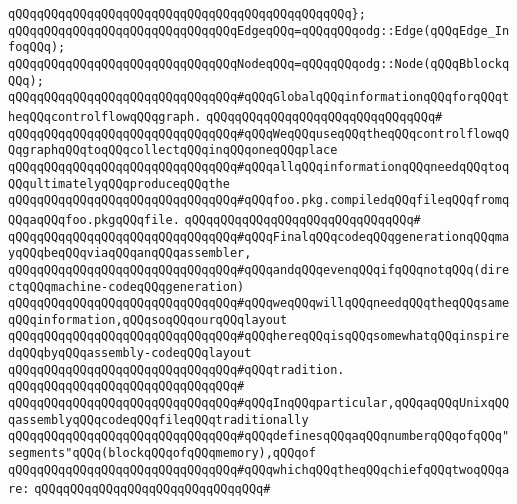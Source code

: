 \verb|qQQqqQQqqQQqqQQqqQQqqQQqqQQqqQQqqQQqqQQqqQQqqQQq};|\newline
\newline
\verb|qQQqqQQqqQQqqQQqqQQqqQQqqQQqqQQqEdgeqQQq=qQQqqQQqodg::Edge(qQQqEdge_InfoqQQq);|\newline
\verb|qQQqqQQqqQQqqQQqqQQqqQQqqQQqqQQqNodeqQQq=qQQqqQQqodg::Node(qQQqBblockqQQq);|\newline
\newline
\verb|qQQqqQQqqQQqqQQqqQQqqQQqqQQqqQQq#qQQqGlobalqQQqinformationqQQqforqQQqtheqQQqcontrolflowqQQqgraph.|\newline
\verb|qQQqqQQqqQQqqQQqqQQqqQQqqQQqqQQq#|\newline
\verb|qQQqqQQqqQQqqQQqqQQqqQQqqQQqqQQq#qQQqWeqQQquseqQQqtheqQQqcontrolflowqQQqgraphqQQqtoqQQqcollectqQQqinqQQqoneqQQqplace|\newline
\verb|qQQqqQQqqQQqqQQqqQQqqQQqqQQqqQQq#qQQqallqQQqinformationqQQqneedqQQqtoqQQqultimatelyqQQqproduceqQQqthe|\newline
\verb|qQQqqQQqqQQqqQQqqQQqqQQqqQQqqQQq#qQQqfoo.pkg.compiledqQQqfileqQQqfromqQQqaqQQqfoo.pkgqQQqfile.|\newline
\verb|qQQqqQQqqQQqqQQqqQQqqQQqqQQqqQQq#|\newline
\verb|qQQqqQQqqQQqqQQqqQQqqQQqqQQqqQQq#qQQqFinalqQQqcodeqQQqgenerationqQQqmayqQQqbeqQQqviaqQQqanqQQqassembler,|\newline
\verb|qQQqqQQqqQQqqQQqqQQqqQQqqQQqqQQq#qQQqandqQQqevenqQQqifqQQqnotqQQq(directqQQqmachine-codeqQQqgeneration)|\newline
\verb|qQQqqQQqqQQqqQQqqQQqqQQqqQQqqQQq#qQQqweqQQqwillqQQqneedqQQqtheqQQqsameqQQqinformation,qQQqsoqQQqourqQQqlayout|\newline
\verb|qQQqqQQqqQQqqQQqqQQqqQQqqQQqqQQq#qQQqhereqQQqisqQQqsomewhatqQQqinspiredqQQqbyqQQqassembly-codeqQQqlayout|\newline
\verb|qQQqqQQqqQQqqQQqqQQqqQQqqQQqqQQq#qQQqtradition.|\newline
\verb|qQQqqQQqqQQqqQQqqQQqqQQqqQQqqQQq#|\newline
\verb|qQQqqQQqqQQqqQQqqQQqqQQqqQQqqQQq#qQQqInqQQqparticular,qQQqaqQQqUnixqQQqassemblyqQQqcodeqQQqfileqQQqtraditionally|\newline
\verb|qQQqqQQqqQQqqQQqqQQqqQQqqQQqqQQq#qQQqdefinesqQQqaqQQqnumberqQQqofqQQq"segments"qQQq(blockqQQqofqQQqmemory),qQQqof|\newline
\verb|qQQqqQQqqQQqqQQqqQQqqQQqqQQqqQQq#qQQqwhichqQQqtheqQQqchiefqQQqtwoqQQqare:|\newline
\verb|qQQqqQQqqQQqqQQqqQQqqQQqqQQqqQQq#|\newline
